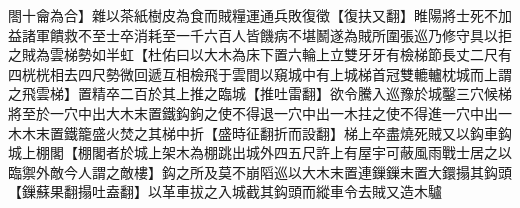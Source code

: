 閤十龠為合】雜以茶紙樹皮為食而賊糧運通兵敗復徵【復扶又翻】睢陽將士死不加益諸軍饋救不至士卒消耗至一千六百人皆饑病不堪鬭遂為賊所圍張巡乃修守具以拒之賊為雲梯勢如半虹【杜佑曰以大木為床下置六輪上立雙牙牙有檢梯節長丈二尺有四桄桄相去四尺勢微回遞互相檢飛于雲間以窺城中有上城梯首冠雙轆轤枕城而上謂之飛雲梯】置精卒二百於其上推之臨城【推吐雷翻】欲令騰入巡豫於城鑿三穴候梯將至於一穴中出大木末置鐵鈎鉤之使不得退一穴中出一木拄之使不得進一穴中出一木木末置鐵籠盛火焚之其梯中折【盛時征翻折而設翻】梯上卒盡燒死賊又以鈎車鈎城上棚閣【棚閣者於城上架木為棚跳出城外四五尺許上有屋宇可蔽風雨戰士居之以臨禦外敵今人謂之敵樓】鈎之所及莫不崩䧟巡以大木末置連鏁鏁末置大鐶搨其鈎頭【鏁蘇果翻搨吐盍翻】以革車拔之入城截其鈎頭而縱車令去賊又造木驢